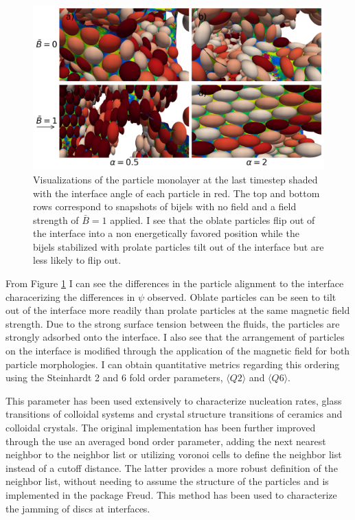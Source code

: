 \begin{figure}
        \centering
        \includegraphics[scale = 0.4]{figures/results/paper1/psi_concat.png}
        \caption{Visualizations of the particle monolayer at the last timestep shaded with the interface angle of each particle in red. The top and bottom
                 rows correspond to snapshots of bijels with no field and a field strength of $\bar{B} = 1$ applied. I see that the oblate particles flip
                 out of the interface into a non energetically favored position while the bijels stabilized with prolate particles tilt out of the interface
                 but are less likely to flip out.}
        \label{fig:psi_viz_ss}
\end{figure}

From Figure \ref{fig:psi_viz_ss} I can see the differences in the particle alignment to the interface characerizing the differences in $\psi$ observed. Oblate
particles can be seen to tilt out of the interface more readily than prolate particles at the same magnetic field strength. Due to the strong surface tension
between the fluids, the particles are strongly adsorbed onto the interface. I also see that the arrangement of particles on the interface is modified through the
application of the magnetic field for both particle morphologies. I can obtain quantitative metrics regarding this ordering using the Steinhardt 2 and 6 fold
order parameters, $\langle Q2 \rangle$ and $\langle Q6 \rangle$. 

This parameter has been used extensively to characterize nucleation rates, glass transitions of colloidal systems and crystal structure transitions of ceramics 
and colloidal crystals. \cite{vagberg_glassiness_2011, besseling_three-dimensional_2007, schall_structural_2007} The original implementation has been further 
improved through the use an averaged bond order parameter, adding the next nearest neighbor to the neighbor list or utilizing voronoi cells to define the 
neighbor list instead of a cutoff distance. The latter provides a more robust definition of the neighbor list, without needing to assume the structure of 
the particles and is implemented in the package Freud. \cite{ramasubramani_freud_2020} This method has been used to characterize the jamming of discs at 
interfaces. \cite{ozawa_jamming_2012}

